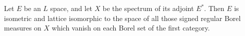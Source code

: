Let $E$ be an $L$ space, and let $X$ be the spectrum of its adjoint $E^*$. Then $E$ is isometric and lattice isomorphic to the space of all those signed regular Borel measures on $X$ which vanish on each Borel set of the first category.
